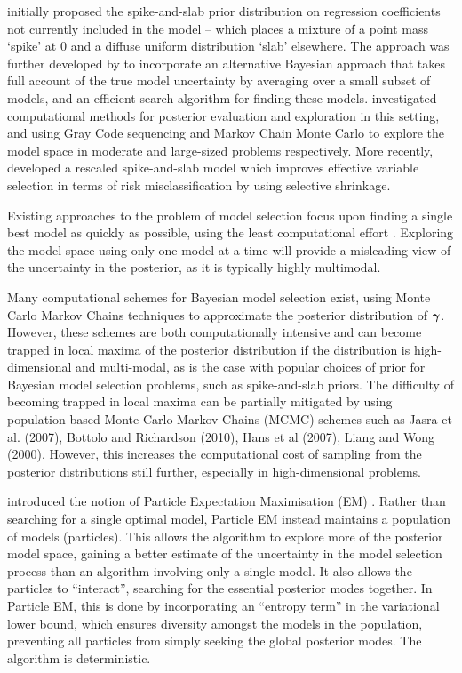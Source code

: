 \cite{Mitchell1988} initially proposed the spike-and-slab prior distribution on
regression coefficients not currently included in the model -- which places a
mixture of a point mass `spike' at $0$ and a diffuse uniform distribution
`slab' elsewhere. The approach was further developed by \cite{Madigan1994} to
incorporate an alternative Bayesian approach that takes full account of the
true model uncertainty by averaging over a small subset of models, and an
efficient search algorithm for finding these models. \cite{George1997}
investigated computational methods for posterior evaluation and exploration in
this setting, and using Gray Code sequencing and Markov Chain Monte Carlo to
explore the model space in moderate and large-sized problems respectively.
More recently, \cite{Ishwaran2005} developed a rescaled spike-and-slab model
which improves effective variable selection in terms of risk misclassification
by using selective shrinkage.


Existing approaches to the problem of model selection focus upon finding a
single best model as quickly as possible, using the least computational effort
\citep{You2014,Rockova2014}. Exploring the model space using only one
model at a time will provide a misleading view of the uncertainty in the
posterior, as it is typically highly multimodal.

Many computational schemes for Bayesian model selection exist, using Monte
Carlo Markov Chains techniques to approximate the posterior distribution of
${\boldsymbol \gamma}$. However, these schemes are both computationally intensive and can
become \\ trapped in local maxima of the posterior distribution if the
distribution is high-dimensional and multi-modal, as is the case with popular
choices of prior for Bayesian model selection problems, such as spike-and-slab
priors. The difficulty of becoming trapped in local maxima can be partially
mitigated by using population-based Monte Carlo Markov Chains (MCMC) schemes
such as Jasra et al. (2007), Bottolo and Richardson (2010), Hans et al (2007),
Liang and Wong (2000).  However, this increases the computational cost of
sampling from the posterior distributions still further, especially in
high-dimensional problems.

\cite{Rockova2017} introduced the notion of Particle Expectation Maximisation
(EM) \@. Rather than searching for a single optimal model, Particle EM instead
maintains a population of models (particles). This allows the algorithm to
explore more of the posterior model space, gaining a better estimate of the
uncertainty in the model selection process than an algorithm involving only a
single model.  It also allows the particles to ``interact'', searching for the
essential posterior modes together. In Particle EM, this is done by
incorporating an ``entropy term'' in the variational lower bound, which
ensures diversity amongst the models in the population, preventing all
particles from simply seeking the global posterior modes. The algorithm is
deterministic.

